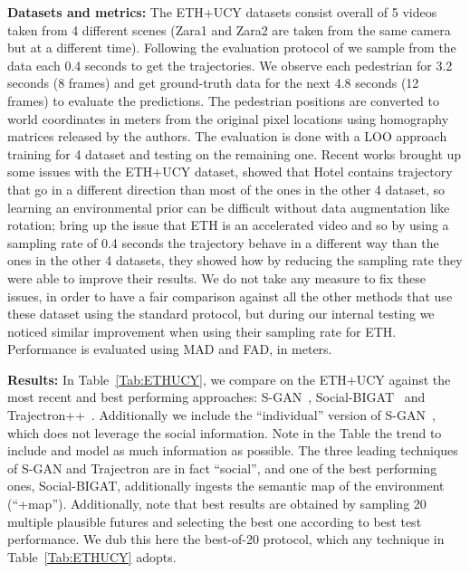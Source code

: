 \documentclass[a4paper,conference]{IEEEtran}
\begin{document}
\noindent\textbf{Datasets and metrics:} The ETH+UCY datasets consist overall of 5 videos taken from 4 different scenes (Zara1 and Zara2 are taken from the same camera but at a different time). Following the evaluation protocol of \cite{alahi2016cvpr} we sample from the data each 0.4 seconds to get the trajectories. We observe each pedestrian for 3.2 seconds (8 frames) and get ground-truth data for the next 4.8 seconds (12 frames) to evaluate the predictions. 
The pedestrian positions are converted to world coordinates in meters from the original pixel locations using homography matrices released by the authors.
The evaluation is done with a LOO approach training for 4 dataset and testing on the remaining one.
Recent works brought up some issues with the ETH+UCY dataset, \cite{scholler2020constant} showed that Hotel contains trajectory that go in a different direction than most of the ones in the other 4 dataset, so learning an environmental prior can be difficult without data augmentation like rotation; \cite{zhang2019sr} bring up the issue that ETH is an accelerated video and so by using a sampling rate of 0.4 seconds the trajectory behave in a different way than the ones in the other 4 datasets, they showed how by reducing the sampling rate they were able to improve their results.
We do not take any measure to fix these issues, in order to have a fair comparison against all the other methods that use these dataset using the standard protocol, but during our internal testing we noticed similar improvement when using their sampling rate for ETH.
Performance is evaluated using MAD and FAD, in meters.


\noindent\textbf{Results:} In Table~\ref{Tab:ETHUCY}, we compare on the ETH+UCY against the most recent and best performing approaches: S-GAN~\cite{gupta2018social}, Social-BIGAT~\cite{kosaraju2019social} and Trajectron++~\cite{salzmann2020trajectron++}. Additionally we include the ``individual'' version of S-GAN~\cite{gupta2018social}, which does not leverage the social information. Note in the Table the trend to include and model as much information as possible. The three leading techniques of S-GAN and Trajectron are in fact ``social'', and one of the best performing ones, Social-BIGAT, additionally ingests the semantic map of the environment (``+map''). Additionally, note that best results are obtained by sampling 20 multiple plausible futures and selecting the best one according to best test performance. We dub this here the best-of-20 protocol, which any technique in Table~\ref{Tab:ETHUCY} adopts.
\end{document}
